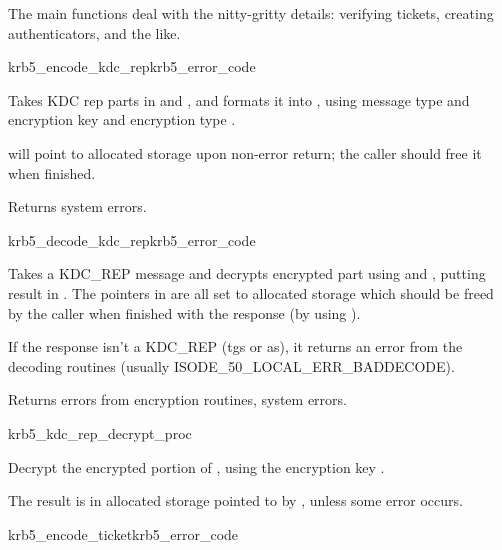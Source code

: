 The main functions deal with the nitty-gritty details: verifying
tickets, creating authenticators, and the like.

\begin{funcdecl}{krb5_encode_kdc_rep}{krb5_error_code}{\funcin}
\funcinout
{}
\funcout
{}
\end{funcdecl}

Takes KDC rep parts in  and , and
formats it into , using message type 
and encryption key  and encryption type
.

 will point to  allocated storage upon
non-error return; the caller should free it when finished.

Returns system errors.

\begin{funcdecl}{krb5_decode_kdc_rep}{krb5_error_code}{\funcin}
\funcout
{}
\end{funcdecl}

Takes a KDC_REP message and decrypts encrypted part using
 and , putting result in .
The pointers in 
are all set to allocated storage which should be freed by the caller
when finished with the response (by using ).


If the response isn't a KDC_REP (tgs or as), it returns an error from
the decoding routines (usually ISODE_50_LOCAL_ERR_BADDECODE).

Returns errors from encryption routines, system errors.

\begin{funcdecl}{krb5_kdc_rep_decrypt_proc}{\funcin}
\funcinout
{}
\end{funcdecl}
Decrypt the encrypted portion of , using the
encryption key .

The result is in allocated storage pointed to by
, unless some error occurs.

\begin{funcdecl}{krb5_encode_ticket}{krb5_error_code}{\funcin}
\funcout
{}
\end{funcdecl}

